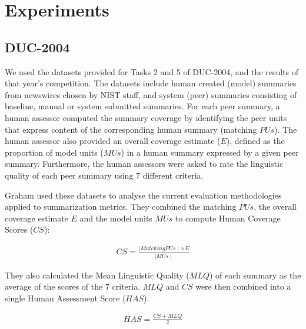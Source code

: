 \documentclass[11pt,a4paper]{article}
\newcommand{\duc}{\textsc{DUC-2004}\xspace}
\begin{document}
\section{Experiments}
\label{sec:experiments}

\subsection{\duc}
\label{ssec:duc}

We used the datasets provided for Tasks 2 and 5 of \duc \cite{Over:2004}, and the 
results of that year's competition. The datasets include human created (model) summaries 
from newswires chosen by NIST staff, and system (peer) summaries consisting of baseline, 
manual or system submitted summaries. For each peer summary, a human assessor computed the 
summary coverage by identifying the peer units that express content of the corresponding 
human summary (matching $PUs$). The human assessor also provided an overall coverage 
estimate ($E$), defined as the proportion of model units ($MUs$) in a human summary 
expressed by a given peer summary. Furthermore, the human assessors were asked to rate 
the linguistic quality of each peer summary using 7 different criteria.

Graham used these datasets to analyse the current evaluation methodologies 
applied to summarization metrics. They combined the matching $PUs$, the overall coverage 
estimate $E$ and the model units $MUs$ to compute Human Coverage Scores ($CS$):

\begin{align}
CS = \frac{\mid Matching PUs \mid\times E}{\mid MUs \mid}
\end{align}

They also calculated the Mean Linguistic Quality ($MLQ$) of each summary as the average 
of the scores of the 7 criteria. $MLQ$ and $CS$ were then combined into a single Human 
Assessment Score ($HAS$):

\begin{align}
HAS = \frac{CS + MLQ}{2}
\end{align}
\end{document}
